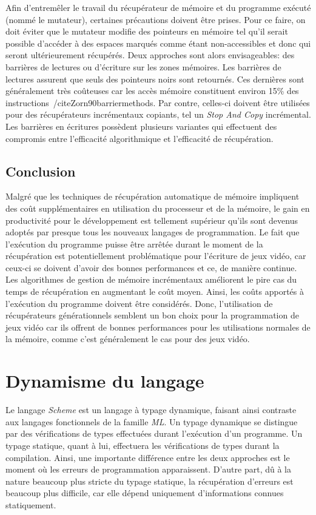 \documentclass[12pt,twoside,letterpaper,francais]{book}
\newcommand{\Schemelang}{{\textit{Scheme }}}
\begin{document}
Afin d'entremêler le travail du récupérateur de mémoire et du
programme exécuté (nommé le mutateur), certaines précautions doivent
être prises. Pour ce faire, on doit éviter que le mutateur modifie des
pointeurs en mémoire tel qu'il serait possible d'accéder à des espaces
marqués comme étant non-accessibles et donc qui seront ultérieurement
récupérés. Deux approches sont alors envisageables: des barrières de
lectures ou d'écriture sur les zones mémoires. Les barrières de
lectures assurent que seuls des pointeurs noirs sont retournés. Ces
dernières sont généralement très coûteuses car les accès mémoire
constituent environ 15\% des
instructions~/cite{Zorn90barriermethods}. Par contre, celles-ci
doivent être utilisées pour des récupérateurs incrémentaux copiants,
tel un \textit{Stop And Copy} incrémental. Les barrières en écritures
possèdent plusieurs variantes qui effectuent des compromis entre
l'efficacité algorithmique et l'efficacité de récupération.


\FloatBarrier
\subsection{Conclusion}
Malgré que les techniques de récupération automatique de mémoire
impliquent des coût supplémentaires en utilisation du processeur et de
la mémoire, le gain en productivité pour le développement est
tellement supérieur qu'ils sont devenus adoptés par presque tous les
nouveaux langages de programmation. Le fait que l'exécution du
programme puisse être arrêtée durant le moment de la récupération est
potentiellement problématique pour l'écriture de jeux vidéo, car
ceux-ci se doivent d'avoir des bonnes performances et ce, de manière
continue. Les algorithmes de gestion de mémoire incrémentaux
améliorent le pire cas du temps de récupération en augmentant le coût
moyen. Ainsi, les coûts apportés à l'exécution du programme doivent
être considérés. Donc, l'utilisation de récupérateurs générationnels
semblent un bon choix pour la programmation de jeux vidéo car ils
offrent de bonnes performances pour les utilisations normales de la
mémoire, comme c'est généralement le cas pour des jeux vidéo.


\FloatBarrier
\section{Dynamisme du langage}
Le langage \Schemelang est un langage à typage dynamique, faisant
ainsi contraste aux langages fonctionnels de la famille
\textit{ML}. Un typage dynamique se distingue par des vérifications de
types effectuées durant l'exécution d'un programme. Un typage
statique, quant à lui, effectuera les vérifications de types durant la
compilation. Ainsi, une importante différence entre les deux approches
est le moment où les erreurs de programmation apparaissent. D'autre
part, dû à la nature beaucoup plus stricte du typage statique, la
récupération d'erreurs est beaucoup plus difficile, car elle dépend
uniquement d'informations connues statiquement. 
\end{document}
